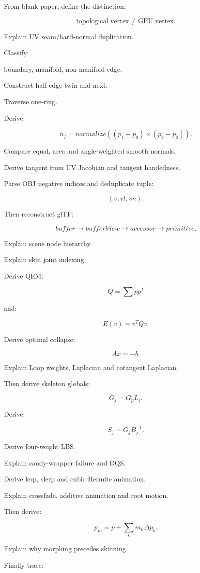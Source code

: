 From blank paper, define the distinction:

\[
\text{topological vertex}
\neq
\text{GPU vertex}.
\]

Explain UV seam/hard-normal duplication.

Classify:

boundary, manifold, non-manifold edge.

Construct half-edge twin and next.

Traverse one-ring.

Derive:

\[
n_f=
normalize(
(p_1-p_0)\times(p_2-p_0)
).
\]

Compare equal, area and angle-weighted smooth normals.

Derive tangent from UV Jacobian and tangent handedness.

Parse OBJ negative indices and deduplicate tuple:

\[
(v,vt,vn).
\]

Then reconstruct glTF:

\[
buffer
\rightarrow
bufferView
\rightarrow
accessor
\rightarrow
primitive.
\]

Explain scene node hierarchy.

Explain skin joint indexing.

Derive QEM:

\[
Q=
\sum pp^T
\]

and:

\[
E(v)=v^TQv.
\]

Derive optimal collapse:

\[
Ax=-b.
\]

Explain Loop weights, Laplacian and cotangent Laplacian.

Then derive skeleton globals:

\[
G_j=
G_pL_j.
\]

Derive:

\[
S_j=
G_jB_j^{-1}.
\]

Derive four-weight LBS.

Explain candy-wrapper failure and DQS.

Derive lerp, slerp and cubic Hermite animation.

Explain crossfade, additive animation and root motion.

Then derive:

\[
p_m=
p+
\sum_km_k\Delta p_k.
\]

Explain why morphing precedes skinning.

Finally trace:

